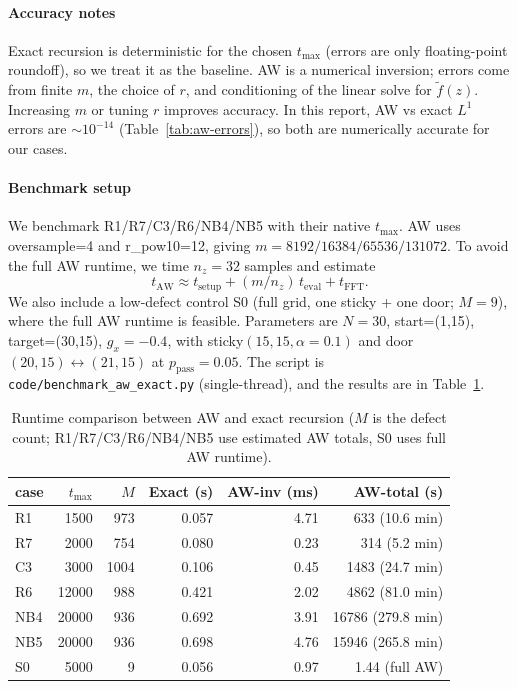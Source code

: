 \documentclass[11pt]{article}
\begin{document}
\paragraph{Accuracy notes}
Exact recursion is deterministic for the chosen $t_{\max}$ (errors are only floating-point roundoff), so we treat it as the baseline. AW is a numerical inversion; errors come from finite $m$, the choice of $r$, and conditioning of the linear solve for $\tilde f(z)$. Increasing $m$ or tuning $r$ improves accuracy. In this report, AW vs exact $L^1$ errors are $\sim 10^{-14}$ (Table~\ref{tab:aw-errors}), so both are numerically accurate for our cases.

\paragraph{Benchmark setup}
We benchmark R1/R7/C3/R6/NB4/NB5 with their native $t_{\max}$. AW uses oversample=4 and r\_pow10=12, giving $m=8192/16384/65536/131072$. To avoid the full AW runtime, we time $n_z=32$ samples and estimate
\[
  t_{\mathrm{AW}}\approx t_{\mathrm{setup}} + (m/n_z)\,t_{\mathrm{eval}} + t_{\mathrm{FFT}}.
\]
We also include a low-defect control S0 (full grid, one sticky + one door; $M=9$), where the full AW runtime is feasible. Parameters are $N=30$, start=(1,15), target=(30,15), $g_x=-0.4$, with sticky$(15,15,\alpha=0.1)$ and door$(20,15)\leftrightarrow(21,15)$ at $p_{\text{pass}}=0.05$.
The script is \texttt{code/benchmark\_aw\_exact.py} (single-thread), and the results are in Table~\ref{tab:aw-speed}.

\begin{table}[!htbp]
  \centering
  \begin{tabular}{lrrrrr}
    \toprule
    case & $t_{\max}$ & $M$ & Exact (s) & AW-inv (ms) & AW-total (s) \\
    \midrule
    R1  & 1500  & 973 & 0.057 & 4.71 & 633 (10.6 min) \\
    R7  & 2000  & 754 & 0.080 & 0.23 & 314 (5.2 min) \\
    C3  & 3000  & 1004 & 0.106 & 0.45 & 1483 (24.7 min) \\
    R6  & 12000 & 988 & 0.421 & 2.02 & 4862 (81.0 min) \\
    NB4 & 20000 & 936 & 0.692 & 3.91 & 16786 (279.8 min) \\
    NB5 & 20000 & 936 & 0.698 & 4.76 & 15946 (265.8 min) \\
    S0  & 5000  & 9   & 0.056 & 0.97 & 1.44 (full AW) \\
    \bottomrule
  \end{tabular}
  \caption{Runtime comparison between AW and exact recursion ($M$ is the defect count; R1/R7/C3/R6/NB4/NB5 use estimated AW totals, S0 uses full AW runtime).}
  \label{tab:aw-speed}
\end{table}
\end{document}
